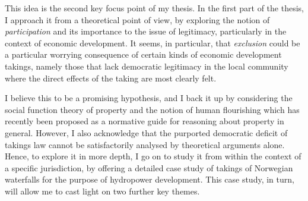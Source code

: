 This idea is the second key focus point of my thesis. In the first part of the thesis, I approach it from a theoretical point of view, by exploring the notion of {\it participation} and its importance to the issue of legitimacy, particularly in the context of economic development. It seems, in particular, that {\it exclusion} could be a particular worrying consequence of certain kinds of economic development takings, namely those that lack democratic legitimacy in the local community where the direct effects of the taking are most clearly felt.

I believe this to be a promising hypothesis, and I back it up by considering the social function theory of property and the notion of human flourishing which has recently been proposed as a normative guide for reasoning about property in general. However, I also acknowledge that the purported democratic deficit of takings law cannot be satisfactorily analysed by theoretical arguments alone. Hence, to explore it in more depth, I go on to study it from within the context of a specific jurisdiction, by offering a detailed case study of takings of Norwegian waterfalls for the purpose of hydropower development. This case study, in turn, will allow me to cast light on two further key themes. %



